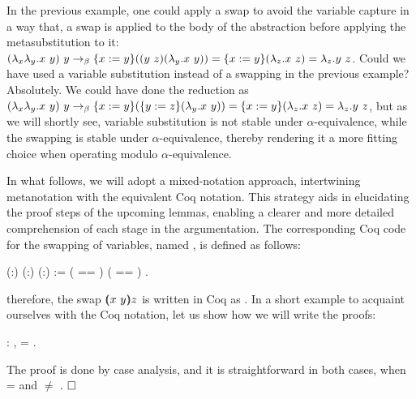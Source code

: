 In the previous example, one could apply a swap to avoid the variable capture in a way that, a swap is applied to the body of the abstraction before applying the metasubstitution to it: $(\lambda_x\lambda_y.x\ y)\ y \to_{\beta} \metasub{(\swap{y}{z}{(\lambda_y.x\ y)})}{x}{y} = \metasub{(\lambda_z.x\ z)}{x}{y} = \lambda_z.y\ z$. Could we have used a variable substitution instead of a swapping in the previous example? Absolutely. We could have done the reduction as $(\lambda_x\lambda_y.x\ y)\ y \to_{\beta} \metasub{(\metasub{(\lambda_y.x\ y)}{y}{z})}{x}{y} = \metasub{(\lambda_z.x\ z)}{x}{y} = \lambda_z.y\ z$, but as we will shortly see, variable substitution is not stable under $\alpha$-equivalence, while the swapping is stable under $\alpha$-equivalence, thereby rendering it a more fitting choice when operating modulo $\alpha$-equivalence.


In what follows, we will adopt a mixed-notation approach, intertwining metanotation with the equivalent Coq notation. This strategy aids in elucidating the proof steps of the upcoming lemmas, enabling a clearer and more detailed comprehension of each stage in the argumentation. The corresponding Coq code for the swapping of variables, named , is defined as follows: 
\begin{coqdoccode}
\coqdocemptyline
\coqdocnoindent
{}  (:) (:) (:) :=  ( == )     ( == )    .\coqdoceol
\coqdocemptyline
\end{coqdoccode}
\noindent therefore, the swap $\vswap{x}{y}{z}$ is written in Coq as    . In a short example to acquaint ourselves with the Coq notation, let us show how we will write the proofs:
\begin{coqdoccode}
\coqdocemptyline
\coqdocnoindent
{} : \coqdockw{\ensuremath{\forall}}  ,     = .\coqdoceol
\end{coqdoccode}
 The proof is done by case analysis, and it is straightforward in both cases, when  =  and  \ensuremath{\not=} . $\hfill\Box$ 
\begin{coqdoccode}
\coqdocemptyline
\end{coqdoccode}
